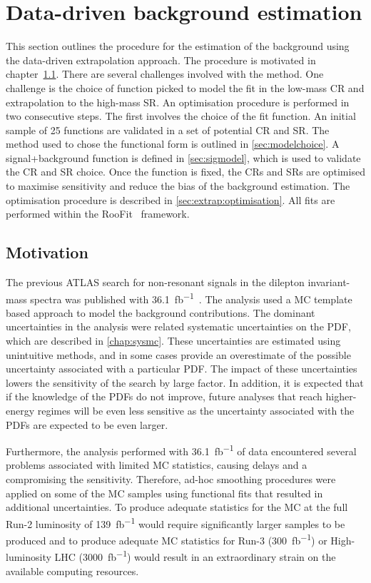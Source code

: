 \chapter{Data-driven background estimation}\label{chap:bkgmodel}
This section outlines the procedure for the estimation of the background using the data-driven extrapolation approach. The procedure is motivated in chapter~\cref{sec:bkgmodel:motivation}. There are several challenges involved with the method. One challenge is the choice of function picked to model the fit in the low-mass CR and extrapolation to the high-mass SR. An optimisation procedure is performed in two consecutive steps. The first involves the choice of the fit function. An initial sample of 25 functions are validated in a set of potential CR and SR. The method used to chose the functional form is outlined in \cref{sec:modelchoice}. A signal+background function is defined in \cref{sec:sigmodel}, which is used to validate the CR and SR choice. Once the function is fixed, the CRs and SRs are optimised to maximise sensitivity and reduce the bias of the background estimation. The optimisation procedure is described in \cref{sec:extrap:optimisation}. All fits are performed within the RooFit~\cite{RooFit} framework.

\section{Motivation}\label{sec:bkgmodel:motivation}
The previous ATLAS search for non-resonant signals in the dilepton invariant-mass spectra was published with \SI{36.1}{\femto\barn^{-1}}~\cite{EXOT-2016-05}. The analysis used a MC template based approach to model the background contributions. The dominant uncertainties in the analysis were related systematic uncertainties on the PDF, which are described in \cref{chap:sysmc}. These uncertainties are estimated using unintuitive methods, and in some cases provide an overestimate of the possible uncertainty associated with a particular PDF. The impact of these uncertainties lowers the sensitivity of the search by large factor. In addition, it is expected that if the knowledge of the PDFs do not improve, future analyses that reach higher-energy regimes will be even less sensitive as the uncertainty associated with the PDFs are expected to be even larger. 

Furthermore, the analysis performed with \SI{36.1}{\femto\barn^{-1}} of data encountered several problems associated with limited MC statistics, causing delays and a compromising the sensitivity. Therefore, ad-hoc smoothing procedures were applied on some of the MC samples using functional fits that resulted in additional uncertainties. To produce adequate statistics for the MC at the full Run-2 luminosity of \SI{139}{\femto\barn^{-1}} would require significantly larger samples to be produced and to produce adequate MC statistics for Run-3 (\SI{300}{\femto\barn^{-1}}) or High-luminosity LHC (\SI{3000}{\femto\barn^{-1}}) would result in an extraordinary strain on the available computing resources. 

